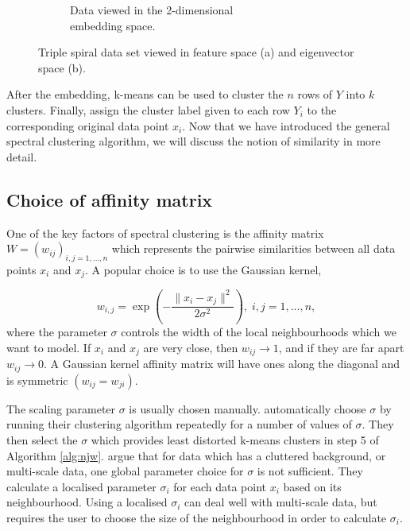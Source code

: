 \begin{figure}[h!]
\begin{subfigure}{0.4\textwidth}
     \caption{Data viewed in the 2-dimensional \\ embedding space. }
     \label{fig:spirals_embedded}
     \end{subfigure}
  \caption{Triple spiral data set viewed in feature space (a) and eigenvector space (b).}
  \label{fig:triple_spirals}
\end{figure}


After the embedding, k-means can be used to cluster the $n$ rows of $Y$ into $k$ clusters. Finally, assign the cluster label given to each row $Y_i$ to the corresponding original data point $x_i$. Now that we have introduced the general spectral clustering algorithm, we will discuss the notion of similarity in more detail.

\subsection{Choice of affinity matrix}
\label{sec:affinity}

One of the key factors of spectral clustering is the affinity matrix $W = (w_{ij})_{ i,j = 1, \ldots, n}$  which represents the pairwise similarities between all data points $x_i$ and $x_j$. A popular choice is to use the Gaussian kernel, 

\begin{equation}
  \label{eq:gaussian_affinity}
    w_{i,j} = \exp  \left( - \frac{\| x_i - x_j \|^2}{2 \sigma^2} \right), \; i, j = 1, \ldots, n,
\end{equation}
where the parameter $\sigma$ controls the width of the local neighbourhoods which we want to model. If $x_i$ and $x_j$ are very close, then $w_{ij} \rightarrow 1 $, and if they are far apart $w_{ij} \rightarrow 0$. A Gaussian kernel affinity matrix will have ones along the diagonal and is symmetric $(w_{ij} = w_{ji})$.

The scaling parameter $\sigma$ is usually chosen manually. \cite{Ng2001} automatically choose $\sigma$ by running their clustering algorithm repeatedly for a number of values of $\sigma$. They then select the $\sigma$ which provides least distorted k-means clusters in step 5 of Algorithm \ref{alg:njw}. \cite{Zelnik-Manor2004} argue that for data which has a cluttered background, or multi-scale data, one global parameter choice for $\sigma$ is not sufficient. They calculate a localised parameter $\sigma_i$ for each data point $x_i$ based on its neighbourhood. Using a localised $\sigma_i$ can deal well with multi-scale data, but requires the user to choose the size of the neighbourhood in order to calculate $\sigma_i$. 

